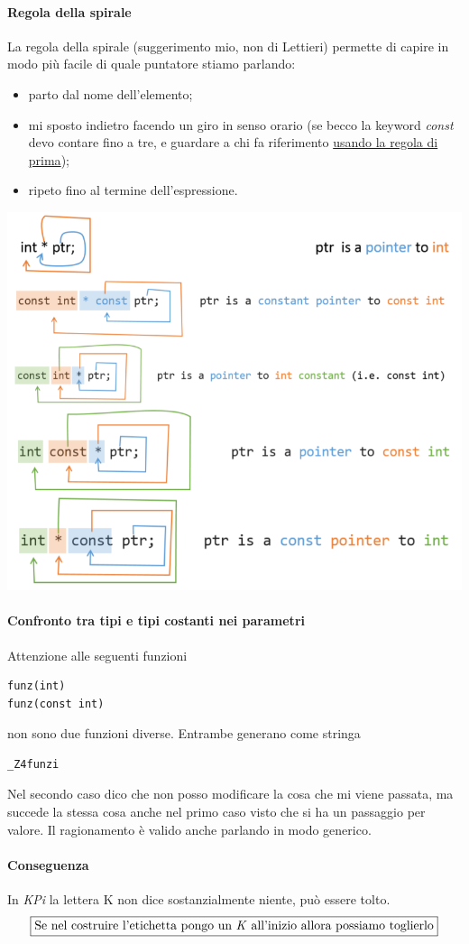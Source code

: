 \documentclass[11pt]{report}
\theoremstyle{definition}
\begin{document}
\paragraph{Regola della spirale} La regola della spirale (suggerimento mio, non di Lettieri) permette di capire in modo più facile di quale puntatore stiamo parlando:
\begin{itemize}
	\item parto dal nome dell'elemento;
	\item mi sposto indietro facendo un giro in senso orario (se becco la keyword \emph{const} devo contare fino a tre, e guardare a chi fa riferimento \underline{usando la regola di prima});
	\item ripeto fino al termine dell'espressione.
\end{itemize}
\begin{center}
	\includegraphics[scale=0.80]{img/154.PNG}
\end{center}  

\paragraph{Confronto tra tipi e tipi costanti nei parametri} Attenzione alle seguenti funzioni
\begin{verbatim}
funz(int)
funz(const int)
\end{verbatim}
non sono due funzioni diverse. Entrambe generano come stringa \begin{verbatim}_Z4funzi\end{verbatim}Nel secondo caso dico che non posso modificare la cosa che mi viene passata, ma succede la stessa cosa anche nel primo caso visto che si ha un passaggio per valore. Il ragionamento è valido anche parlando in modo generico.\paragraph{Conseguenza} In \emph{KPi} la lettera K non dice sostanzialmente niente, può essere tolto.
\[\boxed{\text{Se nel costruire l'etichetta pongo un \emph{K} all'inizio allora possiamo toglierlo}}\]
\end{document}
